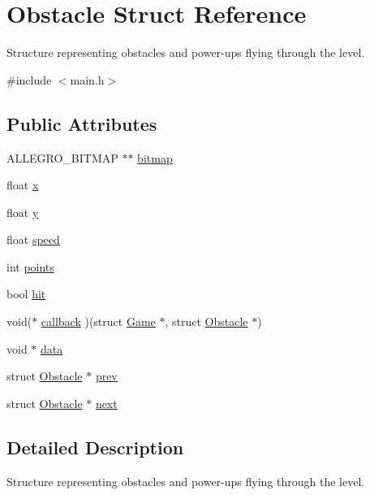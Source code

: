 \hypertarget{structObstacle}{\section{\-Obstacle \-Struct \-Reference}
\label{structObstacle}
}


\-Structure representing obstacles and power-\/ups flying through the level.  




{\ttfamily \#include $<$main.\-h$>$}

\subsection*{\-Public \-Attributes}
\begin{DoxyCompactItemize}
\item 
\-A\-L\-L\-E\-G\-R\-O\-\_\-\-B\-I\-T\-M\-A\-P $\ast$$\ast$ \hyperlink{structObstacle_a1f35f88fe8f6d0664da082f82ae4b774}{bitmap}
\item 
float \hyperlink{structObstacle_ad9cd25e0032f6692a4f93a057ccdfd85}{x}
\item 
float \hyperlink{structObstacle_af4b6f012014e2fa5aef193330f70fdef}{y}
\item 
float \hyperlink{structObstacle_a1e2b46db05325273ce0fcba3550b5b2a}{speed}
\item 
int \hyperlink{structObstacle_a38a164a0e4d6f6508fb65c6eff39147f}{points}
\item 
bool \hyperlink{structObstacle_ac89d025f4ad7c2f083d262c1bee4e851}{hit}
\item 
void($\ast$ \hyperlink{structObstacle_a21b4ff0edaa2dc5394ff7a6328e48358}{callback} )(struct \hyperlink{structGame}{\-Game} $\ast$, struct \hyperlink{structObstacle}{\-Obstacle} $\ast$)
\item 
void $\ast$ \hyperlink{structObstacle_a88728e624cc62993e2bf52aff816cdff}{data}
\item 
struct \hyperlink{structObstacle}{\-Obstacle} $\ast$ \hyperlink{structObstacle_a13bc07b730f58d5b1c3db68e8e4aca27}{prev}
\item 
struct \hyperlink{structObstacle}{\-Obstacle} $\ast$ \hyperlink{structObstacle_aedbcf65351fa59ca9f18f6fba0287dc1}{next}
\end{DoxyCompactItemize}


\subsection{\-Detailed \-Description}
\-Structure representing obstacles and power-\/ups flying through the level. 

